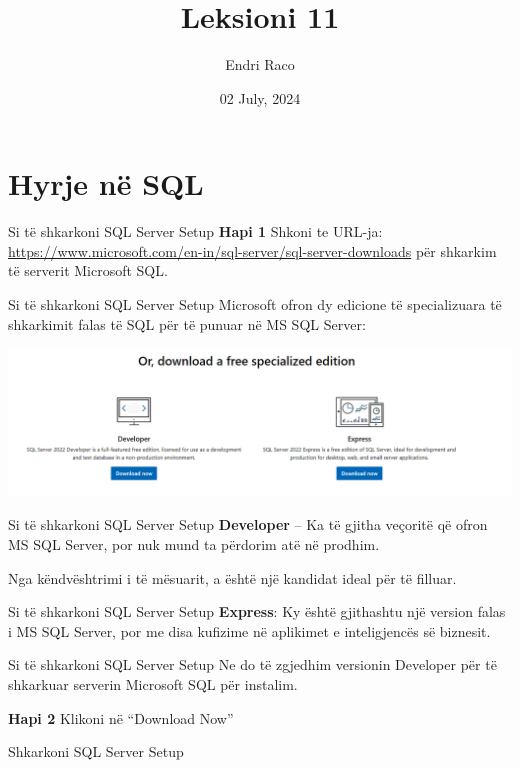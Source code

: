 \documentclass[
  ignorenonframetext,
]{beamer}
\title{Leksioni 11}
\author{Endri Raco}
\date{02 July, 2024}
\begin{document}
\frame{\titlepage}

\begin{frame}[allowframebreaks]
  \tableofcontents[hideallsubsections]
\end{frame}
\section{Hyrje në SQL}\label{hyrje-nuxeb-sql}

\begin{frame}{Si të shkarkoni SQL Server Setup}
\label{si-tuxeb-shkarkoni-sql-server-setup}
\textbf{Hapi 1} Shkoni te URL-ja:
\url{https://www.microsoft.com/en-in/sql-server/sql-server-downloads}
për shkarkim të serverit Microsoft SQL.
\end{frame}

\begin{frame}{Si të shkarkoni SQL Server Setup}
\label{si-tuxeb-shkarkoni-sql-server-setup-1}
Microsoft ofron dy edicione të specializuara të shkarkimit falas të SQL
për të punuar në MS SQL Server:

\includegraphics{./Figs/install1.png}
\end{frame}

\begin{frame}{Si të shkarkoni SQL Server Setup}
\label{si-tuxeb-shkarkoni-sql-server-setup-2}
\textbf{Developer} -- Ka të gjitha veçoritë që ofron MS SQL Server, por
nuk mund ta përdorim atë në prodhim.

Nga këndvështrimi i të mësuarit, a është një kandidat ideal për të
filluar.
\end{frame}

\begin{frame}{Si të shkarkoni SQL Server Setup}
\label{si-tuxeb-shkarkoni-sql-server-setup-3}
\textbf{Express}: Ky është gjithashtu një version falas i MS SQL Server,
por me disa kufizime në aplikimet e inteligjencës së biznesit.
\end{frame}

\begin{frame}{Si të shkarkoni SQL Server Setup}
\label{si-tuxeb-shkarkoni-sql-server-setup-4}
Ne do të zgjedhim versionin Developer për të shkarkuar serverin
Microsoft SQL për instalim.

\textbf{Hapi 2} Klikoni në ``Download Now''

Shkarkoni SQL Server Setup
\end{frame}
\end{document}
